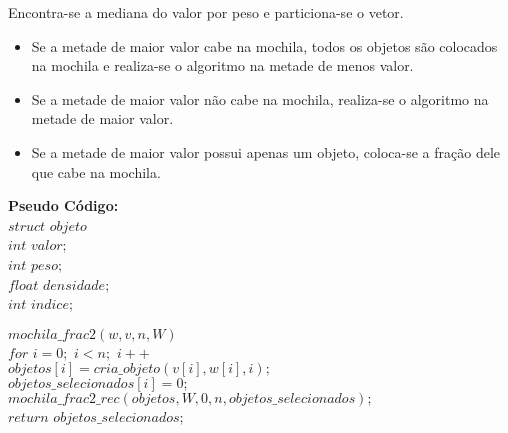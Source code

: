 \documentclass[10pt,a4paper]{article}
\begin{document}
	\tab Encontra-se a mediana do valor por peso e particiona-se o vetor.\\
	
	\begin{itemize}
		\item Se a metade de maior valor cabe na mochila, todos os objetos são colocados na mochila e realiza-se o algoritmo na metade de menos valor. 
		
		\item Se a metade de maior valor não cabe na mochila, realiza-se o algoritmo na metade de maior valor.
		
		\item Se a metade de maior valor possui apenas um objeto, coloca-se a fração dele que cabe na mochila.
	\end{itemize}
	
	
	\textbf{Pseudo Código: }\\
	
	$struct$ $objeto${\\
	
	\hspace{1cm}$int$ $valor;$\\
	
	\hspace{1cm}$int$ $peso;$\\
	
	\hspace{1cm}$float$ $densidade;$\\
	
	\hspace{1cm}$int$ $indice;$\\
	
	}
	
	
	$mochila\_frac2 (w,v,n,W)$\\

	\hspace{1cm}$for$ $i=0;$ $i<n;$ $i++$\\

	\hspace{2cm}$objetos[i] = cria\_objeto(v[i],w[i],i);$\\
	
	\hspace{2cm}$objetos\_selecionados[i] = 0;$\\

	\hspace{1cm}$mochila\_frac2\_rec(objetos, W, 0, n, objetos\_selecionados);$\\

	\hspace{1cm}$return$ $objetos\_selecionados;$\\
	
\end{document}
